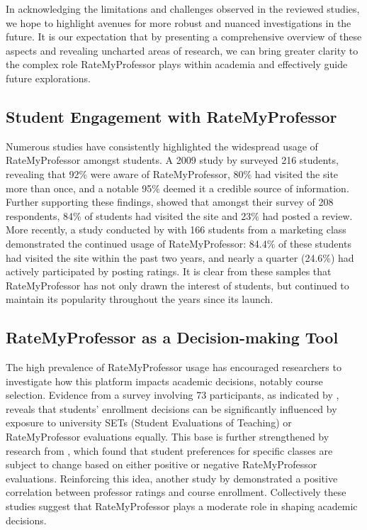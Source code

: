 \documentclass[man, 12pt]{apa7}
\begin{document}
In acknowledging the limitations and challenges observed in the reviewed studies, we hope to highlight avenues for more robust and nuanced investigations in the future. It is our expectation that by presenting a comprehensive overview of these aspects and revealing uncharted areas of research, we can bring greater clarity to the complex role RateMyProfessor plays within academia and effectively guide future explorations.

\subsection{Student Engagement with RateMyProfessor}
Numerous studies have consistently highlighted the widespread usage of RateMyProfessor amongst students. A 2009 study by \textcite{davison_how_2009} surveyed 216 students, revealing that 92\% were aware of RateMyProfessor, 80\% had visited the site more than once, and a notable 95\% deemed it a credible source of information. Further supporting these findings, \textcite{bleske-rechek_ratemyprofessors_2010} showed that amongst their survey of 208 respondents, 84\% of students had visited the site and 23\% had posted a review. More recently, a study conducted by \textcite{chiang_students_2017} with 166 students from a marketing class demonstrated the continued usage of RateMyProfessor: 84.4\% of these students had visited the site within the past two years, and nearly a quarter (24.6\%) had actively participated by posting ratings. It is clear from these samples that RateMyProfessor has not only drawn the interest of students, but continued to maintain its popularity throughout the years since its launch.

\subsection{RateMyProfessor as a Decision-making Tool}
The high prevalence of RateMyProfessor usage has encouraged researchers to investigate how this platform impacts academic decisions, notably course selection. Evidence from a survey involving 73 participants, as indicated by \textcite{boswell_effects_2020}, reveals that students' enrollment decisions can be significantly influenced by exposure to university SETs (Student Evaluations of Teaching) or RateMyProfessor evaluations equally. This base is further strengthened by research from \textcite{orlova_ratemyprofessorscom_2021}, which found that student preferences for specific classes are subject to change based on either positive or negative RateMyProfessor evaluations. Reinforcing this idea, another study by \textcite{johnson_i_2014} demonstrated a positive correlation between professor ratings and course enrollment. Collectively these studies suggest that RateMyProfessor plays a moderate role in shaping academic decisions.
\end{document}
